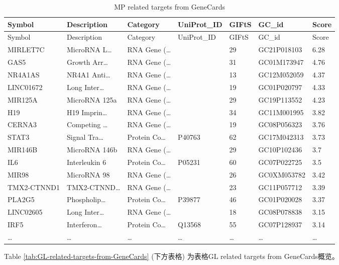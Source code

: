 \documentclass[
]{article}
\begin{document}
\begin{longtable}[]{@{}lllllll@{}}
\caption{\label{tab:MP-related-targets-from-GeneCards}MP related targets from GeneCards}\tabularnewline
\toprule
Symbol & Description & Category & UniProt\_ID & GIFtS & GC\_id & Score\tabularnewline
\midrule
\endfirsthead
\toprule
Symbol & Description & Category & UniProt\_ID & GIFtS & GC\_id & Score\tabularnewline
\midrule
\endhead
MIRLET7C & MicroRNA L\ldots{} & RNA Gene (\ldots{} & & 29 & GC21P018103 & 6.28\tabularnewline
GAS5 & Growth Arr\ldots{} & RNA Gene (\ldots{} & & 31 & GC01M173947 & 4.76\tabularnewline
NR4A1AS & NR4A1 Anti\ldots{} & RNA Gene (\ldots{} & & 13 & GC12M052059 & 4.37\tabularnewline
LINC01672 & Long Inter\ldots{} & RNA Gene (\ldots{} & & 19 & GC01P020797 & 4.33\tabularnewline
MIR125A & MicroRNA 125a & RNA Gene (\ldots{} & & 29 & GC19P113552 & 4.23\tabularnewline
H19 & H19 Imprin\ldots{} & RNA Gene (\ldots{} & & 34 & GC11M001995 & 3.82\tabularnewline
CERNA3 & Competing \ldots{} & RNA Gene (\ldots{} & & 19 & GC08P056323 & 3.76\tabularnewline
STAT3 & Signal Tra\ldots{} & Protein Co\ldots{} & P40763 & 62 & GC17M042313 & 3.73\tabularnewline
MIR146B & MicroRNA 146b & RNA Gene (\ldots{} & & 29 & GC10P102436 & 3.7\tabularnewline
IL6 & Interleukin 6 & Protein Co\ldots{} & P05231 & 60 & GC07P022725 & 3.5\tabularnewline
MIR98 & MicroRNA 98 & RNA Gene (\ldots{} & & 26 & GC0XM053782 & 3.42\tabularnewline
TMX2-CTNND1 & TMX2-CTNND\ldots{} & RNA Gene (\ldots{} & & 23 & GC11P057712 & 3.39\tabularnewline
PLA2G5 & Phospholip\ldots{} & Protein Co\ldots{} & P39877 & 46 & GC01P020028 & 3.37\tabularnewline
LINC02605 & Long Inter\ldots{} & RNA Gene (\ldots{} & & 18 & GC08P078838 & 3.15\tabularnewline
IRF5 & Interferon\ldots{} & Protein Co\ldots{} & Q13568 & 55 & GC07P128937 & 3.14\tabularnewline
\ldots{} & \ldots{} & \ldots{} & \ldots{} & \ldots{} & \ldots{} & \ldots{}\tabularnewline
\bottomrule
\end{longtable}

\begin{center}\vspace{1.5cm}\end{center}

\begin{center}\vspace{1.5cm}\end{center}

Table \ref{tab:GL-related-targets-from-GeneCards} (下方表格) 为表格GL related targets from GeneCards概览。
\end{document}
